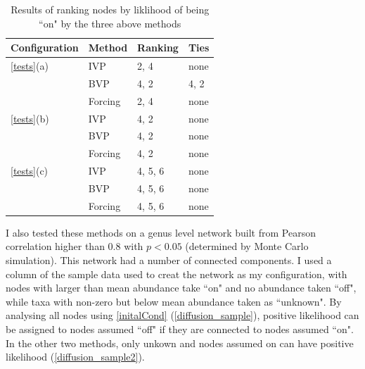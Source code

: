 \documentclass[10pt]{article}
\theoremstyle{definition}
\numberwithin{theorem}{section}
\numberwithin{definition}{section}
\numberwithin{lemma}{section}
\numberwithin{corollary}{section}
\numberwithin{clm}{section}
\numberwithin{rmk}{section}
\begin{document}
\begin{table}
	\begin{center}
\begin{tabular}{|l|l|l|l|}
	\hline Configuration & Method & Ranking & Ties\\
	\hline
	\cref{tests}(a) &  IVP & 2, 4 & none  \\ \cline{2-4}
	 & BVP & 4, 2 & 4, 2 \\ \cline{2-4}
	 & Forcing & 2, 4 & none \\
	\hline
		\cref{tests}(b) &  IVP & 4, 2 &none \\ \cline{2-4}
	& BVP &4, 2 & none  \\ \cline{2-4}
	& Forcing &4, 2 & none\\
	\hline
		\cref{tests}(c) &  IVP & 4, 5, 6& none \\ \cline{2-4}
	& BVP & 4, 5, 6&  none\\ \cline{2-4}
	& Forcing &  4, 5, 6& none \\
	\hline
\end{tabular}
\end{center}
\caption{Results of ranking nodes by liklihood of being ``on" by the three above methods}\label{rankres}
\end{table}
	
I also tested these methods on a genus level network built from Pearson correlation higher than $0.8$ with $p < 0.05$ (determined by Monte Carlo simulation). This network had a number of connected components. I used a column of the sample data used to creat the network as my configuration, with nodes with larger than mean abundance take ``on" and no abundance taken ``off", while taxa with non-zero but below mean abundance taken as ``unknown". By analysing all nodes using \cref{initalCond} (\cref{diffusion_sample}), positive likelihood can be assigned to nodes assumed ``off" if they are connected to nodes assumed ``on". In the other two methods, only unkown and nodes assumed on can have positive likelihood (\cref{diffusion_sample2}).
\end{document}

